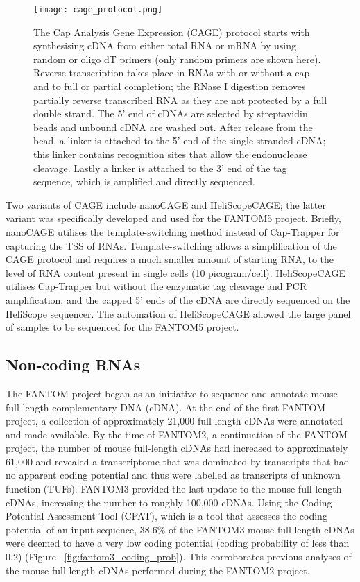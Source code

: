 \begin{figure}[!ht]
   \centering
   \texttt{[image: cage\_protocol.png]}
   \caption[Cap Analysis Gene Expression protocol]{The Cap Analysis Gene Expression (CAGE) protocol starts with synthesising cDNA from either total RNA or mRNA by using random or oligo dT primers (only random primers are shown here). Reverse transcription takes place in RNAs with or without a cap and to full or partial completion; the RNase I digestion removes partially reverse transcribed RNA as they are not protected by a full double strand. The 5' end of cDNAs are selected by streptavidin beads and unbound cDNA are washed out. After release from the bead, a linker is attached to the 5' end of the single-stranded cDNA; this linker contains recognition sites that allow the endonuclease cleavage. Lastly a linker is attached to the 3' end of the tag sequence, which is amplified and directly sequenced.}
   \label{fig:cage_protocol}
\end{figure}

Two variants of CAGE include nanoCAGE\cite{pmid20543846} and HeliScopeCAGE\cite{pmid21596820}; the latter variant was specifically developed and used for the FANTOM5 project. Briefly, nanoCAGE utilises the template-switching method\cite{pmid11314272} instead of Cap-Trapper for capturing the TSS of RNAs. Template-switching allows a simplification of the CAGE protocol and requires a much smaller amount of starting RNA, to the level of RNA content present in single cells (10 picogram/cell). HeliScopeCAGE utilises Cap-Trapper but without the enzymatic tag cleavage and PCR amplification, and the capped 5' ends of the cDNA are directly sequenced on the HeliScope sequencer. The automation of HeliScopeCAGE\cite{pmid22303458} allowed the large panel of samples to be sequenced for the FANTOM5 project.

\subsection{Non-coding RNAs}

The FANTOM project began as an initiative to sequence and annotate mouse full-length complementary DNA (cDNA)\cite{pmid11217851}. At the end of the first FANTOM project, a collection of approximately 21,000 full-length cDNAs were annotated and made available. By the time of FANTOM2, a continuation of the FANTOM project, the number of mouse full-length cDNAs had increased to approximately 61,000 and revealed a transcriptome that was dominated by transcripts that had no apparent coding potential and thus were labelled as transcripts of unknown function (TUFs)\cite{pmid12466851}. FANTOM3 provided the last update to the mouse full-length cDNAs, increasing the number to roughly 100,000 cDNAs\cite{pmid16141072}. Using the Coding-Potential Assessment Tool (CPAT)\cite{pmid23335781}, which is a tool that assesses the coding potential of an input sequence, 38.6\% of the FANTOM3 mouse full-length cDNAs were deemed to have a very low coding potential (coding probability of less than 0.2) (Figure ~\ref{fig:fantom3_coding_prob}). This corroborates previous analyses of the mouse full-length cDNAs performed during the FANTOM2 project.

